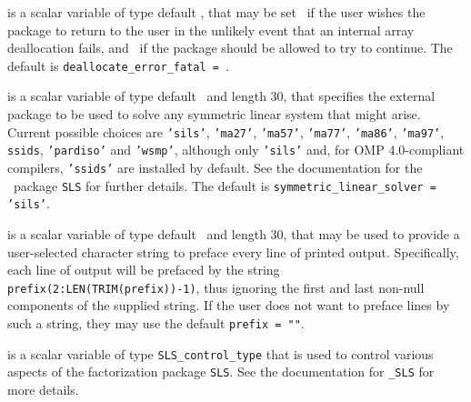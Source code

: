 \documentclass{galahad}
\begin{document}
\begin{description}
 is a scalar variable of type default \logical,
that may be set \true\ if the user wishes the package to return to the user
in the unlikely event that an internal array deallocation fails,
and \false\ if the package should be allowed to try to continue.
The default is {\tt deallocate\_error\_fatal = \false}.

 is a scalar variable of type default \character\
and length 30, that specifies the external package to be used to
solve any symmetric linear system that might arise. Current possible
choices are {\tt 'sils'}, {\tt 'ma27'}, {\tt 'ma57'}, {\tt 'ma77'},
{\tt 'ma86'}, {\tt 'ma97'}, {\tt ssids}, {\tt 'pardiso'}
and {\tt 'wsmp'},
although only {\tt 'sils'} and, for OMP 4.0-compliant compilers,
{\tt 'ssids'} are installed by default.
See the documentation for the \galahad\ package {\tt SLS} for further details.
The default is {\tt symmetric\_linear\_solver = 'sils'}.

 is a scalar variable of type default \character\
and length 30, that may be used to provide a user-selected
character string to preface every line of printed output.
Specifically, each line of output will be prefaced by the string
{\tt prefix(2:LEN(TRIM(prefix))-1)},
thus ignoring the first and last non-null components of the
supplied string. If the user does not want to preface lines by such
a string, they may use the default {\tt prefix = ""}.

 is a scalar variable of type
{\tt SLS\_control\_type} that is used to control various aspects of the
factorization package {\tt SLS}. See the documentation for
{\tt \libraryname\_SLS} for more details.

\end{description}

\end{document}
